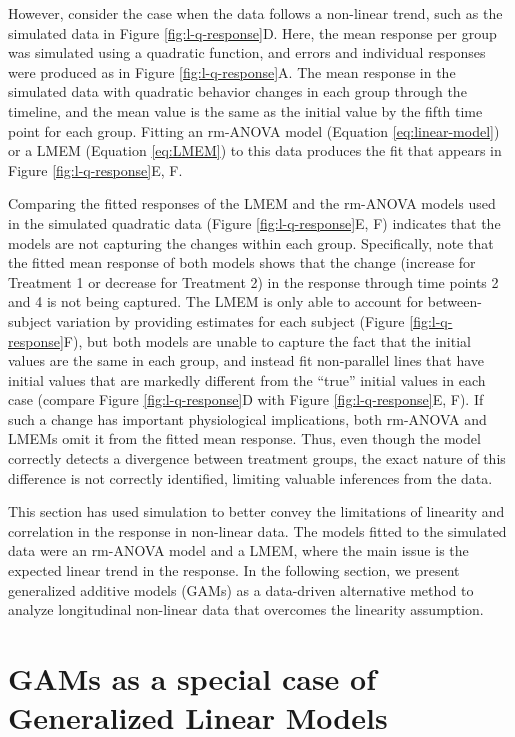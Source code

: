 \documentclass[
]{article}
\begin{document}
However, consider the case when the data follows a non-linear trend, such as the simulated data in Figure \ref{fig:l-q-response}D. Here, the mean response per group was simulated using a quadratic function, and errors and individual responses were produced as in Figure \ref{fig:l-q-response}A. The mean response in the simulated data with quadratic behavior changes in each group through the timeline, and the mean value is the same as the initial value by the fifth time point for each group. Fitting an rm-ANOVA model (Equation \eqref{eq:linear-model}) or a LMEM (Equation \eqref{eq:LMEM}) to this data produces the fit that appears in Figure \ref{fig:l-q-response}E, F.

Comparing the fitted responses of the LMEM and the rm-ANOVA models used in the simulated quadratic data (Figure \ref{fig:l-q-response}E, F) indicates that the models are not capturing the changes within each group. Specifically, note that the fitted mean response of both models shows that the change (increase for Treatment 1 or decrease for Treatment 2) in the response through time points 2 and 4 is not being captured. The LMEM is only able to account for between-subject variation by providing estimates for each subject (Figure \ref{fig:l-q-response}F), but both models are unable to capture the fact that the initial values are the same in each group, and instead fit non-parallel lines that have initial values that are markedly different from the ``true'' initial values in each case (compare Figure \ref{fig:l-q-response}D with Figure \ref{fig:l-q-response}E, F). If such a change has important physiological implications, both rm-ANOVA and LMEMs omit it from the fitted mean response. Thus, even though the model correctly detects a divergence between treatment groups, the exact nature of this difference is not correctly identified, limiting valuable inferences from the data.

This section has used simulation to better convey the limitations of linearity and correlation in the response in non-linear data. The models fitted to the simulated data were an rm-ANOVA model and a LMEM, where the main issue is the expected linear trend in the response. In the following section, we present generalized additive models (GAMs) as a data-driven alternative method to analyze longitudinal non-linear data that overcomes the linearity assumption.

\hypertarget{GAM-theory}{%
\section{GAMs as a special case of Generalized Linear Models}\label{GAM-theory}}
\end{document}
